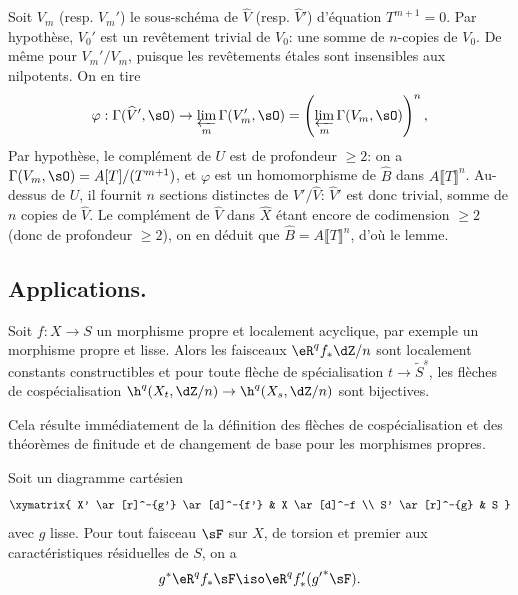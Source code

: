 Soit $V_m$ (resp. $V_m'$) le sous-schéma de $\widehat V$ (resp. $\widehat V'$) 
d'équation $T^{m+1} = 0$. Par hypothèse, $V_0'$ est un revêtement trivial 
de $V_0$: une somme de $n$-copies de $V_0$. De même pour $V_m'/V_m$, puisque 
les revêtements étales sont insensibles aux nilpotents. On en tire 
\[
  \varphi : \Gamma(\widehat V',\sO) \to \varprojlim_m \Gamma(V_m',\sO) = \left(\varprojlim_m \Gamma(V_m,\sO)\right)^n \text{,}
\]
Par hypothèse, le complément de $U$ est de profondeur $\geqslant 2$: on a 
$\Gamma(V_m,\sO)=A[T]/(T^{m+1})$, et $\varphi$ est un homomorphisme de 
$\widehat B$ dans $A\llbracket T\rrbracket^n$. Au-dessus de $U$, il fournit $n$ 
sections distinctes de $\widehat V'/\widehat V$: $\widehat V'$ est donc trivial, 
somme de $n$ copies de $\widehat V$. Le complément de $\widehat V$ dans 
$\widehat X$ étant encore de codimension $\geqslant 2$ (donc de profondeur 
$\geqslant 2$), on en déduit que $\widehat B=A\llbracket T\rrbracket^n$, 
d'où le lemme. 










\subsection{Applications.}\label{I:5-3}





\begin{theoremdotdash}\label{I:5-3-1}
Soit $f:X\to S$ un morphisme propre et localement acyclique, par exemple un 
morphisme propre et lisse. Alors les faisceaux $\eR^q f_*\dZ/n$ sont localement 
constants constructibles et pour toute flèche de spécialisation 
$t\to\widetilde S^s$, les flèches de cospécialisation 
$\h^q(X_t,\dZ/n)\to\h^q(X_s,\dZ/n)$ sont bijectives.
\end{theoremdotdash}

Cela résulte immédiatement de la définition des flèches de 
cospécialisation et des théorèmes de finitude et de changement de base pour 
les morphismes propres. 





\begin{theoremdotdash}\label{I:5-3-2}
Soit un diagramme cartésien 
\[\xymatrix{
  X' \ar[r]^-{g'} \ar[d]^-{f'} 
    & X \ar[d]^-f \\
  S' \ar[r]^-{g} 
    & S
}\]
avec $g$ lisse. Pour tout faisceau $\sF$ sur $X$, de torsion et premier aux 
caractéristiques résiduelles de $S$, on a 
\[
  g^* \eR^q f_* \sF \iso \eR^q f'_*({g'}^* \sF) \text{.}
\]
\end{theoremdotdash}

